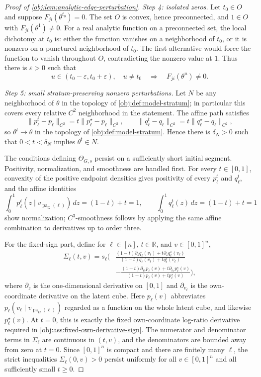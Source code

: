 \begin{proof}[Proof of \cref{obj:lem:analytic-edge-perturbation}]
\emph{Step 4: isolated zeros.}
Let \(t_0\in O\) and suppose \(F_{ji}(\theta^{t_0})=0\).  The set \(O\) is convex, hence preconnected, and \(1\in O\) with \(F_{ji}(\theta^1)\ne0\).  For a real analytic function on a preconnected set, the local dichotomy at \(t_0\) is: either the function vanishes on a neighborhood of \(t_0\), or it is nonzero on a punctured neighborhood of \(t_0\).  The first alternative would force the function to vanish throughout \(O\), contradicting the nonzero value at \(1\).  Thus there is \(\varepsilon>0\) such that
\[
u\in(t_0-\varepsilon,t_0+\varepsilon),\quad u\ne t_0
\quad\Longrightarrow\quad
F_{ji}(\theta^u)\ne0 .
\] %

\emph{Step 5: small stratum-preserving nonzero perturbations.}
Let \(N\) be any neighborhood of \(\theta\) in the topology of \cref{obj:def:model-stratum}; in particular this covers every relative \(C^2\) neighborhood in the statement.  The affine path satisfies
\[
\|p_\ell^t-p_\ell\|_{C^2}=t\|p_\ell^\star-p_\ell\|_{C^2},
\qquad
\|q_\ell^t-q_\ell\|_{C^2}=t\|q_\ell^\star-q_\ell\|_{C^2},
\]
so \(\theta^t\to\theta\) in the topology of \cref{obj:def:model-stratum}.  Hence there is \(\delta_N>0\) such that \(0<t<\delta_N\) implies \(\theta^t\in N\).

The conditions defining \(\Theta_{G,s}\) persist on a sufficiently short initial segment.  Positivity, normalization, and smoothness are handled first.  For every \(t\in[0,1]\), convexity of the positive endpoint densities gives positivity of every \(p_\ell^t\) and \(q_\ell^t\), and the affine identities
\[
\int_0^1 p_\ell^t(z\mid v_{\operatorname{pa}_G(\ell)})\,dz=(1-t)+t=1,
\qquad
\int_0^1 q_\ell^t(z)\,dz=(1-t)+t=1
\]
show normalization; \(C^3\)-smoothness follows by applying the same affine combination to derivatives up to order three.

For the fixed-sign part, define for \(\ell\in[n]\), \(t\in\mathbb R\), and \(v\in[0,1]^n\),
\[
\begin{aligned}
\Sigma_\ell(t,v)
=s_\ell\Bigg(
&\frac{(1-t)\partial_z q_\ell(v_\ell)+t\partial_z q_\ell^\star(v_\ell)}
{(1-t)q_\ell(v_\ell)+tq_\ell^\star(v_\ell)} \\
&-\frac{(1-t)\partial_{v_\ell}p_\ell(v)+t\partial_{v_\ell}p_\ell^\star(v)}
{(1-t)p_\ell(v)+tp_\ell^\star(v)}
\Bigg),
\end{aligned}
\]
where \(\partial_z\) is the one-dimensional derivative on \([0,1]\) and \(\partial_{v_\ell}\) is the own-coordinate derivative on the latent cube.  Here \(p_\ell(v)\) abbreviates \(p_\ell(v_\ell\mid v_{\operatorname{pa}_G(\ell)})\) regarded as a function on the whole latent cube, and likewise \(p_\ell^\star(v)\).  At \(t=0\), this is exactly the fixed own-coordinate log-ratio derivative required in \cref{obj:ass:fixed-own-derivative-sign}.  The numerator and denominator terms in \(\Sigma_\ell\) are continuous in \((t,v)\), and the denominators are bounded away from zero at \(t=0\).  Since \([0,1]^n\) is compact and there are finitely many \(\ell\), the strict inequalities \(\Sigma_\ell(0,v)>0\) persist uniformly for all \(v\in[0,1]^n\) and all sufficiently small \(t\ge0\).


\end{proof}
